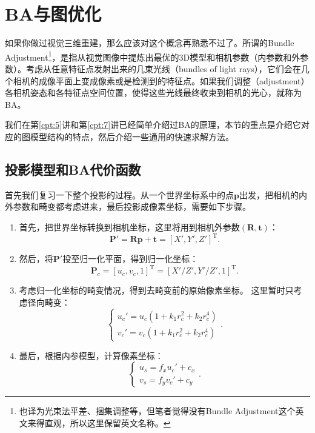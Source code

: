 \section{BA与图优化}
如果你做过视觉三维重建，那么应该对这个概念再熟悉不过了。所谓的Bundle Adjustment\footnote{也译为光束法平差、捆集调整等，但笔者觉得没有Bundle Adjustment这个英文来得直观，所以这里保留英文名称。}，是指从视觉图像中提炼出最优的3D模型和相机参数（内参数和外参数）。考虑从任意特征点发射出来的几束光线（bundles of light rays），它们会在几个相机的成像平面上变成像素或是检测到的特征点。如果我们调整（adjustment）各相机姿态和各特征点空间位置，使得这些光线最终收束到相机的光心\textsuperscript{\cite{Triggs2000}}，就称为BA。

我们在第\ref{cpt:5}讲和第\ref{cpt:7}讲已经简单介绍过BA的原理，本节的重点是介绍它对应的图模型结构的特点，然后介绍一些通用的快速求解方法。

\subsection{投影模型和BA代价函数}
首先我们复习一下整个投影的过程。从一个世界坐标系中的点$\bm{p}$出发，把相机的内外参数和畸变都考虑进来，最后投影成像素坐标，需要如下步骤。

\begin{enumerate}
	\item 首先，把世界坐标转换到相机坐标，这里将用到相机外参数$(\bm{R}, \bm{t})$：
	\begin{equation}
	\bm{P}' = \bm{R} \bm{p} + \bm{t} = [X', Y', Z']^\mathrm{T}.
	\end{equation}
	\item 然后，将$\bm{P}'$投至归一化平面，得到归一化坐标：
	\begin{equation}
	\bm{P}_c = [u_c, v_c, 1]^\mathrm{T} = [X'/Z', Y'/Z', 1]^\mathrm{T}.
	\end{equation}
	\item 考虑归一化坐标的畸变情况，得到去畸变前的原始像素坐标。
这里暂时只考虑径向畸变：
	\begin{equation}
	\left\{
	\begin{array}{l}
	u_c' = {u_c}\left( {1 + {k_1}r_c^2 + {k_2}r_c^4} \right)\\
	v_c' = {v_c}\left( {1 + {k_1}r_c^2 + {k_2}r_c^4} \right)
	\end{array}
	\right. .
	\end{equation}
	\item 最后，根据内参模型，计算像素坐标：
	\begin{equation}
	\left\{ \begin{array}{l}
	{u_s} = {f_x}u_c' + {c_x}\\
	{v_s} = {f_y}v_c' + {c_y} 
	\end{array} \right. .
	\end{equation}
\end{enumerate}

